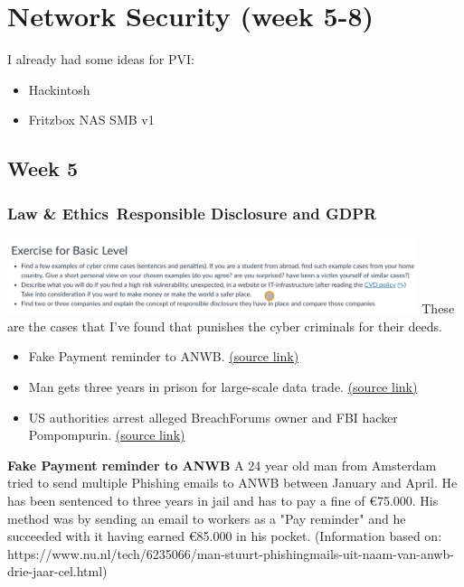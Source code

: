 \documentclass[12pt, letterpaper]{article}
\begin{document}
\section{Network Security (week 5-8)}
I already had some ideas for PVI:
\begin{itemize}
    \item Hackintosh
    \item Fritzbox NAS SMB v1
\end{itemize}
\subsection{Week 5}
\subsubsection{Law \& Ethics\, Responsible Disclosure and GDPR}
\includegraphics[width=0.9\textwidth]{fotos/Week 5/Assignment laws and ethics.jpeg}
\hfill\break
These are the cases that I've found that punishes the cyber criminals for their deeds.
\begin{itemize}
    \item Fake Payment reminder to ANWB. \href{https://www.nu.nl/tech/6235066/man-stuurt-phishingmails-uit-naam-van-anwb-drie-jaar-cel.html}{(source link)}
    \item Man gets three years in prison for large-scale data trade. \href{https://www.nu.nl/tech/6205158/man-krijgt-drie-jaar-cel-voor-grootschalige-datahandel.html}{(source link)}
    \item US authorities arrest alleged BreachForums owner and FBI hacker Pompompurin. \href{https://www.engadget.com/us-authorities-arrest-alleged-breachforums-owner-and-fbi-hacker-pompompurin-170009266.html?guccounter=1&guce_referrer=aHR0cHM6Ly9kdWNrZHVja2dvLmNvbS8&guce_referrer_sig=AQAAAEQpBy2kyPUw8ATdF7w0YnJKYmFnjlXQBih0kfhNxBKIz72UCOUpxu9292uBgp_UYr943Ch6jme-7qPjiaPoIvwA0tF3gzqrTQ53lsHHJLU7iIAFF4HlycLB-xIWOjEry79rP-CuyE__yIWz8JT8XhYLqHe6qQjX4liyn7WTZRug}{(source link)}
\end{itemize}
\newpage
\textbf{Fake Payment reminder to ANWB}
\hfill\break
A 24 year old man from Amsterdam tried to send multiple Phishing emails to ANWB between January and April. He has been sentenced to three years in jail and has to pay a fine of €75.000. His method was by sending an email to workers as a "Pay reminder" and he succeeded with it having earned €85.000 in his pocket. (Information based on: https://www.nu.nl/tech/6235066/man-stuurt-phishingmails-uit-naam-van-anwb-drie-jaar-cel.html)
\end{document}
